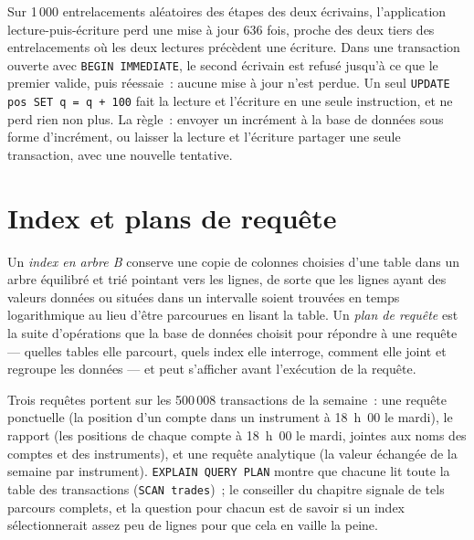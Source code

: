 Sur 1\,000 entrelacements aléatoires des étapes des deux écrivains, l'application lecture-puis-écriture perd une mise à jour 636 fois, proche des deux
tiers des entrelacements où les deux lectures précèdent une écriture. Dans une transaction ouverte avec \texttt{BEGIN IMMEDIATE}, le second écrivain est
refusé jusqu'à ce que le premier valide, puis réessaie~: aucune mise à jour n'est perdue. Un seul \texttt{UPDATE pos SET q = q + 100} fait la lecture et l'écriture
en une seule instruction, et ne perd rien non plus. La règle~: envoyer un incrément à la base de données sous forme d'incrément, ou laisser la lecture et l'écriture
partager une seule transaction, avec une nouvelle tentative.

\section{Index et plans de requête}

\begin{definition}\label{def:pl:databases-and-sql:index}
Un \emph{index en arbre B} conserve une copie de colonnes choisies d'une table dans un arbre équilibré et trié pointant vers les lignes, de sorte
que les lignes ayant des valeurs données ou situées dans un intervalle soient trouvées en temps logarithmique au lieu d'être parcourues en lisant la table. Un
\emph{plan de requête} est la suite d'opérations que la base de données choisit pour répondre à une requête --- quelles tables elle parcourt, quels index elle interroge, comment elle joint
et regroupe les données --- et peut s'afficher avant l'exécution de la requête.
\end{definition}

Trois requêtes portent sur les 500\,008 transactions de la semaine~: une requête ponctuelle (la position d'un compte dans un instrument à 18~h~00 le mardi), le
rapport (les positions de chaque compte à 18~h~00 le mardi, jointes aux noms des comptes et des instruments), et une requête analytique (la
valeur échangée de la semaine par instrument). \texttt{EXPLAIN QUERY PLAN} montre que chacune lit toute la table des transactions (\texttt{SCAN trades})~; le conseiller du chapitre
signale de tels parcours complets, et la question pour chacun est de savoir si un index sélectionnerait assez peu de lignes pour que cela en vaille la peine.

